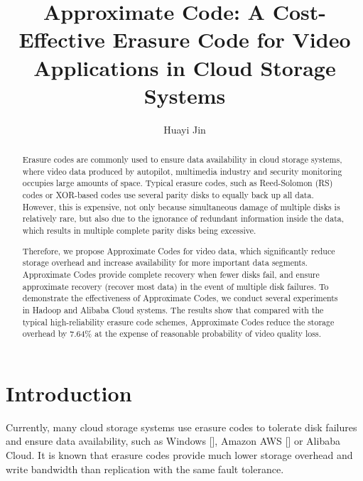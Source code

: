 \documentclass[sigconf]{acmart}
\begin{document}
\title{Approximate Code: A Cost-Effective Erasure Code for Video Applications in Cloud Storage Systems}

\author{Huayi Jin}



\begin{abstract}
Erasure codes are commonly used to ensure data availability in cloud storage systems, where video data produced by autopilot, multimedia industry and security monitoring occupies large amounts of space.
Typical erasure codes, such as Reed-Solomon (RS) \cite{macwilliams1977theory} codes or XOR-based codes use several parity disks to equally back up all data.
However, this is expensive, not only because simultaneous damage of multiple disks is relatively rare, but also due to the ignorance of redundant information inside the data, which results in multiple complete parity disks being excessive.


Therefore, we propose Approximate Codes for video data, which significantly reduce storage overhead and increase availability for more important data segments.
Approximate Codes provide complete recovery when fewer disks fail, and ensure approximate recovery (recover most data) in the event of multiple disk failures.
To demonstrate the effectiveness of Approximate Codes, we conduct several experiments in Hadoop and Alibaba Cloud systems.
The results show that compared with the typical high-reliability erasure code schemes, Approximate Codes reduce the storage overhead by 7.64\% at the expense of reasonable probability of video quality loss.
\end{abstract}

%
%

\maketitle

\section{Introduction}
Currently, many cloud storage systems use erasure codes to tolerate disk failures and ensure data availability, such as Windows [], Amazon AWS [] or Alibaba Cloud. It is known that erasure codes provide much lower storage overhead and write bandwidth than replication with the same fault tolerance.
\end{document}
